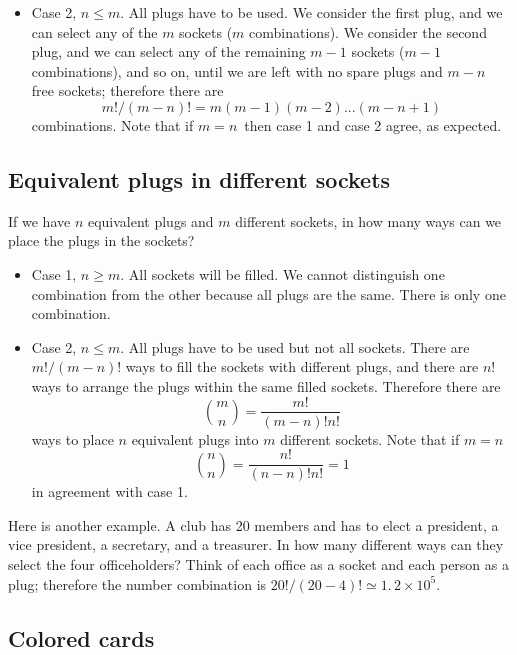 \documentclass[justified, sixbynine]{tufte-book}
\theoremstyle{plain}%
\newtheorem * {corollary}{Corollary}
\theoremstyle{definition}
\theoremstyle{remark}
\newtheorem * {remark}{Remark}
\newtheorem * {note}{Note}
\begin{document}
\begin{fullwidth}
\begin{itemize}
\item  Case 2, $n\leq m$. All plugs have to be used. We consider the first
plug, and we can select any of the $m$ sockets ($m$ combinations). We
consider the second plug, and we can select any of the remaining $m-1$
sockets ($m-1$ combinations), and so on, until we are left with no spare
plugs and $m-n$ free sockets; therefore there are
\begin{equation}
m!/(m-n)!=m(m-1)(m-2)...(m-n+1)
\end{equation}
combinations. Note that if $m=n\, $ then case 1 and case 2 agree, as
expected.
\end{itemize}

\goodbreak\subsection{Equivalent plugs in different sockets}

If we have $n$ equivalent plugs and $m$ different sockets, in how many ways
can we place the plugs in the sockets?

\begin{itemize}
\item  Case 1, $n\geq m$. All sockets will be filled. We cannot distinguish
one combination from the other because all plugs are the same. There is only
one combination.

\item  Case 2, $n\leq m$. All plugs have to be used but not all sockets.
There are $m!/(m-n)!$ ways to fill the sockets with different plugs, and
there are $n!$ ways to arrange the plugs within the same filled sockets.
Therefore there are
\begin{equation}
\binom mn=\frac{m!}{(m-n)!n!}
\end{equation}
ways to place $n$ equivalent plugs into $m$ different sockets. Note that if $%
m=n$%
\begin{equation}
\binom nn=\frac{n!}{(n-n)!n!}=1
\end{equation}
in agreement with case 1.
\end{itemize}

Here is another example. A club has 20 members and has to elect a president, a vice president, 
a secretary, and a treasurer. In how many different ways can they select the
four officeholders? Think of each office as a socket and each person as a
plug; therefore the number combination is $20!/(20-4)!\simeq \allowbreak
1.\, 2\times 10^5$.

\goodbreak\subsection{Colored cards}


\end{fullwidth}
\end{document}
